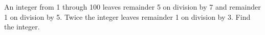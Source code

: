 An integer from 1 through 100 leaves remainder 5 on division by 7 and remainder 1 on division by 5. Twice the integer leaves remainder 1 on division by 3. Find the integer.
